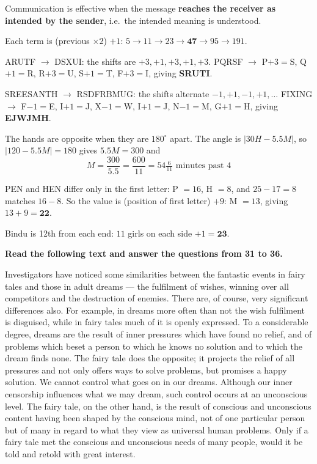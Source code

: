 Communication is effective when the message \textbf{reaches the receiver as intended by the sender}, i.e.\ the intended meaning is understood.

Each term is (previous $\times2$) $+1$: $5\rightarrow11\rightarrow23\rightarrow\mathbf{47}\rightarrow95\rightarrow191$.

ARUTF $\rightarrow$ DSXUI: the shifts are $+3, +1, +3, +1, +3$.
PQRSF $\rightarrow$ P$+3=$S, Q$+1=$R, R$+3=$U, S$+1=$T, F$+3=$I, giving \textbf{SRUTI}.

SREESANTH $\rightarrow$ RSDFRBMUG: the shifts alternate $-1, +1, -1, +1, \ldots$
FIXING $\rightarrow$ F$-1=$E, I$+1=$J, X$-1=$W, I$+1=$J, N$-1=$M, G$+1=$H, giving \textbf{EJWJMH}.

The hands are opposite when they are $180^\circ$ apart. The angle is $|30H-5.5M|$, so $|120-5.5M|=180$ gives $5.5M=300$ and
\[M=\frac{300}{5.5}=\frac{600}{11}=54\tfrac{6}{11}\text{ minutes past 4}\]

PEN and HEN differ only in the first letter: P $=16$, H $=8$, and $25-17=8$ matches $16-8$. So the value is (position of first letter) $+9$: M $=13$, giving $13+9=\mathbf{22}$.

Bindu is 12th from each end: $11$ girls on each side $+1=\mathbf{23}$.

\textbf{Read the following text and answer the questions from 31 to 36.}\par\smallskip
Investigators have noticed some similarities between the fantastic events in fairy tales and those in adult dreams --- the fulfilment of wishes, winning over all competitors and the destruction of enemies. There are, of course, very significant differences also. For example, in dreams more often than not the wish fulfilment is disguised, while in fairy tales much of it is openly expressed. To a considerable degree, dreams are the result of inner pressures which have found no relief, and of problems which beset a person to which he knows no solution and to which the dream finds none. The fairy tale does the opposite; it projects the relief of all pressures and not only offers ways to solve problems, but promises a happy solution. We cannot control what goes on in our dreams. Although our inner censorship influences what we may dream, such control occurs at an unconscious level. The fairy tale, on the other hand, is the result of conscious and unconscious content having been shaped by the conscious mind, not of one particular person but of many in regard to what they view as universal human problems. Only if a fairy tale met the conscious and unconscious needs of many people, would it be told and retold with great interest.

